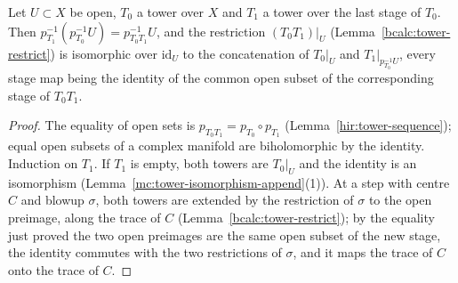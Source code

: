 \begin{lemma}
\label{mc:tower-isomorphism-restrict-append}
\leanok
Let \(U\subset X\) be open, \(T_0\) a tower over \(X\) and \(T_1\) a tower over the last stage of \(T_0\). Then \(p_{T_1}^{-1}(p_{T_0}^{-1}U)=p_{T_0T_1}^{-1}U\), and the restriction
\((T_0T_1)|_U\) (Lemma~\ref{bcalc:tower-restrict}) is isomorphic over \(\mathrm{id}_U\) to the concatenation of \(T_0|_U\) and \(T_1|_{p_{T_0}^{-1}U}\), every stage map being the identity
of the common open subset of the corresponding stage of \(T_0T_1\).
\end{lemma}
\begin{proof}
\leanok
The equality of open sets is \(p_{T_0T_1}=p_{T_0}\circ p_{T_1}\) (Lemma~\ref{hir:tower-sequence}); equal open subsets of a complex manifold are biholomorphic by the identity.
Induction on \(T_1\). If \(T_1\) is empty, both towers are \(T_0|_U\) and the identity is an isomorphism (Lemma~\ref{mc:tower-isomorphism-append}(1)). At a step with centre \(C\)
and blowup \(\sigma\), both towers are extended by the restriction of \(\sigma\) to the open preimage, along the trace of \(C\) (Lemma~\ref{bcalc:tower-restrict}); by the equality
just proved the two open preimages are the same open subset of the new stage, the identity commutes with the two restrictions of \(\sigma\), and it maps the trace of \(C\) onto
the trace of \(C\).
\end{proof}

